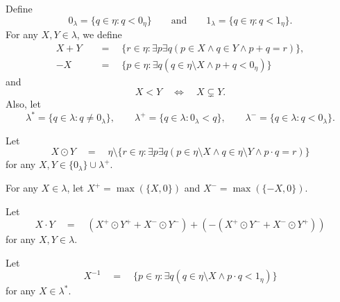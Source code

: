 \documentclass[11pt]{article}
\begin{document}
\begin{definition}
  Define
  \begin{equation*}
    0_\lambda = \{q \in \eta: q < 0_\eta\}
    \qquad \text{and} \qquad
    1_\lambda = \{q \in \eta: q < 1_\eta\}.
  \end{equation*}
  For any $X, Y \in \lambda$, we define
  \begin{align*}
    X + Y \quad &= \quad \{r \in \eta: \exists p \exists q (p \in X \wedge q \in Y \wedge p + q = r)\}, \\
    -X \quad &= \quad \{p \in \eta: \exists q (q \in \eta \setminus X \wedge p + q < 0_\eta)\}
  \end{align*}
  and
  \begin{equation*}
    X < Y \quad \iff \quad X \subsetneq Y.
  \end{equation*}
  Also, let
  \begin{equation*}
    \lambda^* = \{q \in \lambda: q \neq 0_\lambda\}, \qquad
    \lambda^+ = \{q \in \lambda: 0_\lambda < q\}, \qquad
    \lambda^- = \{q \in \lambda: q < 0_\lambda\}.
  \end{equation*}
\end{definition}

\begin{definition}
  Let
  \begin{equation*}
    X \odot Y \quad = \quad \eta \setminus \{r \in \eta: \exists p \exists q (p \in \eta \setminus X \wedge q \in \eta \setminus Y \wedge p \cdot q = r)\}
  \end{equation*}
  for any $X, Y \in \{0_\lambda\} \cup \lambda^+$.
\end{definition}

\begin{definition}
  For any $X \in \lambda$, let $X^+ = \max(\{X, 0\})$ and $X^- = \max(\{-X, 0\})$.
\end{definition}

\begin{definition}
  Let
  \begin{equation*}
    X \cdot Y \quad = \quad (X^+ \odot Y^+ + X^- \odot Y^-) + (-(X^+ \odot Y^- + X^- \odot Y^+))
  \end{equation*}
  for any $X, Y \in \lambda$.
\end{definition}

\begin{definition}
  Let
  \begin{equation*}
    X^{-1} \quad = \quad \{p \in \eta: \exists q (q \in \eta \setminus X \wedge p \cdot q < 1_\eta)\}
  \end{equation*}
  for any $X \in \lambda^*$.
\end{definition}
\end{document}

